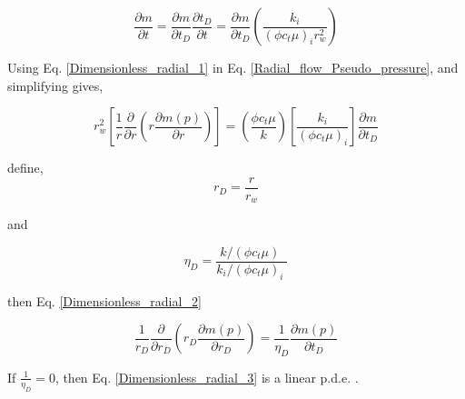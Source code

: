 \documentclass{llncs}
\numberwithin{equation}{section}
\numberwithin{figure}{section}
\numberwithin{table}{section}
\begin{document}
    \begin{equation}
        \frac{\partial m}{\partial t}=\frac{\partial m}{\partial {{t}_{D}}}\frac{\partial {{t}_{D}}}{\partial t}=\frac{\partial m}{\partial {{t}_{D}}}\left( \frac{{{k}_{i}}}{{{\left( \phi {{c}_{t}}\mu  \right)}_{i}}r_{w}^{2}} \right)
        \label{Dimensionless_radial_1}
    \end{equation}

    Using Eq. \ref{Dimensionless_radial_1} in Eq. \ref{Radial_flow_Pseudo_pressure}, and simplifying gives,

    \begin{equation}
        r_{w}^{2}\left[ \frac{1}{r}\frac{\partial }{\partial r}\left( r\frac{\partial m\left( p \right)}{\partial r} \right) \right]=\left( \frac{\phi {{c}_{t}}\mu }{k} \right)\left[ \frac{{{k}_{i}}}{{{\left( \phi {{c}_{t}}\mu  \right)}_{i}}} \right]\frac{\partial m}{\partial {{t}_{D}}}
        \label{Dimensionless_radial_2}
    \end{equation}

     define,
    \begin{equation}
        {{r}_{D}}=\frac{r}{{{r}_{w}}}
        \label{Dimensionless_lenght}
    \end{equation}

    and 

    \begin{equation}
        {{\eta }_{D}}=\frac{{k}/{\left( \phi {{c}_{t}}\mu  \right)}\;}{{{{k}_{i}}}/{{{\left( \phi {{c}_{t}}\mu  \right)}_{i}}}\;}
        \label{Dimensionless_diffusivity}
    \end{equation}

    then Eq. \ref{Dimensionless_radial_2} 

    \begin{equation}
        \frac{1}{{{r}_{D}}}\frac{\partial }{\partial {{r}_{D}}}\left( {{r}_{D}}\frac{\partial m\left( p \right)}{\partial {{r}_{D}}} \right)=\frac{1}{{{\eta }_{D}}}\frac{\partial m\left( p \right)}{\partial {{t}_{D}}}
        \label{Dimensionless_radial_3}
    \end{equation}

    If $\frac{1}{{{\eta }_{D}}}=0$, then Eq. \ref{Dimensionless_radial_3} is a linear p.d.e. .
\end{document}
